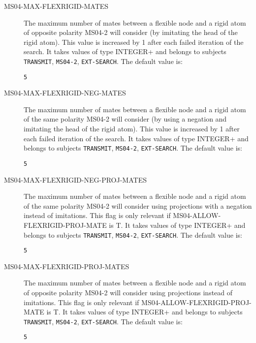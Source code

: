 \begin{description}
\item[MS04-MAX-FLEXRIGID-MATES]  
The maximum number of mates between a flexible node and a rigid atom of opposite polarity 
MS04-2 will consider (by imitating the head of the rigid atom).
This value is increased by 1 after each failed iteration of the search.
It takes values of type INTEGER+ and belongs to subjects \texttt{TRANSMIT}, \texttt{MS04-2}, \texttt{EXT-SEARCH}.  The default value is: \begin{lstlisting}
5
\end{lstlisting}

\item[MS04-MAX-FLEXRIGID-NEG-MATES]  
The maximum number of mates between a flexible node and a rigid atom of the same polarity 
MS04-2 will consider (by using a negation and imitating the head of the rigid atom).
This value is increased by 1 after each failed iteration of the search.
It takes values of type INTEGER+ and belongs to subjects \texttt{TRANSMIT}, \texttt{MS04-2}, \texttt{EXT-SEARCH}.  The default value is: \begin{lstlisting}
5
\end{lstlisting}

\item[MS04-MAX-FLEXRIGID-NEG-PROJ-MATES]  
The maximum number of mates between a flexible node and a rigid atom of the same polarity 
MS04-2 will consider using projections with a negation instead of imitations.
This flag is only relevant if MS04-ALLOW-FLEXRIGID-PROJ-MATE is T.
It takes values of type INTEGER+ and belongs to subjects \texttt{TRANSMIT}, \texttt{MS04-2}, \texttt{EXT-SEARCH}.  The default value is: \begin{lstlisting}
5
\end{lstlisting}

\item[MS04-MAX-FLEXRIGID-PROJ-MATES]  
The maximum number of mates between a flexible node and a rigid atom of opposite polarity 
MS04-2 will consider using projections instead of imitations.
This flag is only relevant if MS04-ALLOW-FLEXRIGID-PROJ-MATE is T.
It takes values of type INTEGER+ and belongs to subjects \texttt{TRANSMIT}, \texttt{MS04-2}, \texttt{EXT-SEARCH}.  The default value is: \begin{lstlisting}
5
\end{lstlisting}


\end{description}
